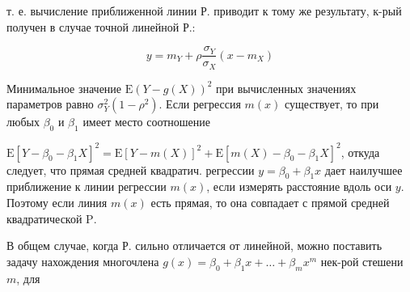 \documentclass[10pt]{article}
\begin{document}
т. е. вычисление приближенной линии Р. приводит к тому же результату, к-рый получен в случае точной линейной Р.:



\[

y=m_{Y}+\rho \frac{\sigma_{Y}}{\sigma_{X}}\left(x-m_{X}\right)

\]



Минимальное значение $\mathrm{E}(Y-g(X))^{2}$ при вычисленных значениях параметров равно $\sigma_{Y}^{2}\left(1-\rho^{2}\right)$. Если регрессия $m(x)$ существует, то при любых $\beta_{0}$ и $\beta_{1}$ имеет место соотношение



$\mathrm{E}\left[Y-\beta_{0}-\beta_{1} X\right]^{2}=\mathrm{E}[Y-m(X)]^{2}+\mathrm{E}\left[m(X)-\beta_{0}-\beta_{1} X\right]^{2}$, откуда следует, что прямая средней квадратич. регрессии $y=\beta_{0}+\beta_{1} x$ дает наилучшее приближение к линии регрессии $m(x)$, если измерять расстояние вдоль оси $y$. Поэтому если линия $m(x)$ есть прямая, то она совпадает с прямой средней квадратической $\mathrm{P}$.



В общем случае, когда Р. сильно отличается от линейной, можно поставить задачу нахождения многочлена $g(x)=\beta_{0}+\beta_{1} x+\ldots+\beta_{m} x^{m}$ нек-рой стешени $m$, для
\end{document}
